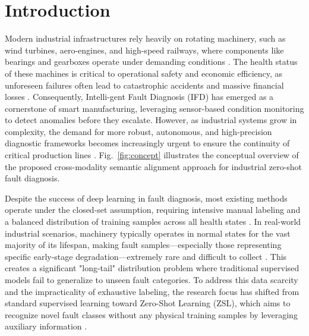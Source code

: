 \documentclass[journal]{IEEEtran}
\begin{document}
\section{Introduction}
Modern industrial infrastructures rely heavily on rotating machinery, such as wind turbines, aero-engines, and high-speed railways, where components like bearings and gearboxes operate under demanding conditions \cite{zhai2021multi}. The health status of these machines is critical to operational safety and economic efficiency, as unforeseen failures often lead to catastrophic accidents and massive financial losses \cite{lei2020applications}. Consequently, Intelli-gent Fault Diagnosis (IFD) has emerged as a cornerstone of smart manufacturing, leveraging sensor-based condition monitoring to detect anomalies before they escalate. However, as industrial systems grow in complexity, the demand for more robust, autonomous, and high-precision diagnostic frameworks becomes increasingly urgent to ensure the continuity of critical production lines \cite{li2020deep}. Fig.~\ref{fig:concept} illustrates the conceptual overview of the proposed cross-modality semantic alignment approach for industrial zero-shot fault diagnosis.

Despite the success of deep learning in fault diagnosis, most existing methods operate under the closed-set assumption, requiring intensive manual labeling and a balanced distribution of training samples across all health states \cite{zhang2022digital}. In real-world industrial scenarios, machinery typically operates in normal states for the vast majority of its lifespan, making fault samples—especially those representing specific early-stage degradation—extremely rare and difficult to collect \cite{liu2018zero}. This creates a significant "long-tail" distribution problem where traditional supervised models fail to generalize to unseen fault categories. To address this data scarcity and the impracticality of exhaustive labeling, the research focus has shifted from standard supervised learning toward Zero-Shot Learning (ZSL), which aims to recognize novel fault classes without any physical training samples by leveraging auxiliary information \cite{wang2019zero, socher2013zero}.
\end{document}
